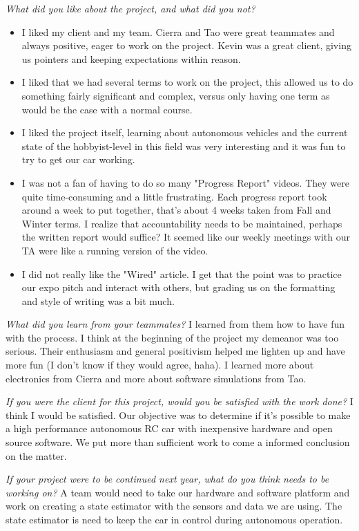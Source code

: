 \documentclass[compsoc,draftclsnofoot,onecolumn,10pt]{IEEEtran}
\begin{document}
\textit{What did you like about the project, and what did you not?}
\begin{itemize}
    \item I liked my client and my team. Cierra and Tao were great teammates and always positive, eager to work on the project. Kevin was a great client, giving us pointers and keeping expectations within reason.
    \item I liked that we had several terms to work on the project, this allowed us to do something fairly significant and complex, versus only having one term as would be the case with a normal course.
    \item I liked the project itself, learning about autonomous vehicles and the current state of the hobbyist-level in this field was very interesting and it was fun to try to get our car working.
    \item I was not a fan of having to do so many "Progress Report" videos. They were quite time-consuming and a little frustrating. Each progress report took around a week to put together, that's about 4 weeks taken from Fall and Winter terms. I realize that accountability needs to be maintained, perhaps the written report would suffice? It seemed like our weekly meetings with our TA were like a running version of the video.
    \item I did not really like the "Wired" article. I get that the point was to practice our expo pitch and interact with others, but grading us on the formatting and style of writing was a bit much.
\end{itemize}

\textit{What did you learn from your teammates?}
I learned from them how to have fun with the process. I think at the beginning of the project my demeanor was too serious. Their enthusiasm and general positivism helped me lighten up and have more fun (I don't know if they would agree, haha). I learned more about electronics from Cierra and more about software simulations from Tao.


\textit{If you were the client for this project, would you be satisfied with the work done?}
I think I would be satisfied. Our objective was to determine if it's possible to make a high performance autonomous RC car with inexpensive hardware and open source software. We put more than sufficient work to come a informed conclusion on the matter.


\textit{If your project were to be continued next year, what do you think needs to be working on?}
A team would need to take our hardware and software platform and work on creating a state estimator with the sensors and data we are using. The state estimator is need to keep the car in control during autonomous operation.
\end{document}
